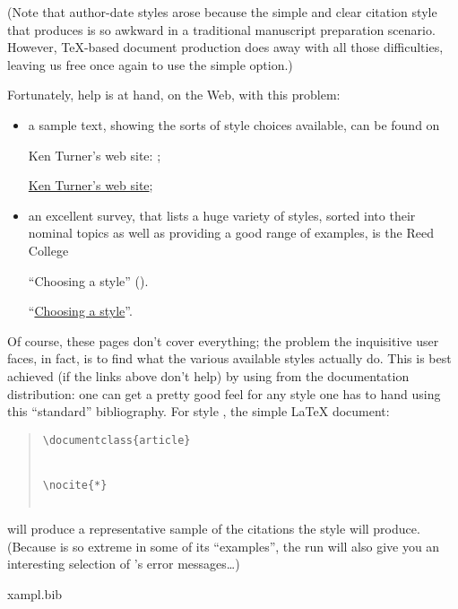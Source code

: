(Note that author-date styles arose because the simple and clear
citation style that  produces is so awkward in a
traditional manuscript preparation scenario.  However, \TeX{}-based
document production does away with all those difficulties, leaving us
free once again to use the simple option.)

Fortunately, help is at hand, on the Web, with this problem:
\begin{itemize}
\item a sample text, showing the sorts of style choices available, can
  be found on 
\begin{narrowversion}
  Ken Turner's web site:
  ;
\end{narrowversion}
\begin{wideversion}
  \href{http://www.cs.stir.ac.uk/~kjt/software/latex/showbst.html}{Ken Turner's web site};
\end{wideversion}
\item an excellent survey, that lists a huge variety of styles,
  sorted into their nominal topics as well as providing a good range
  of examples, is the Reed College %
\begin{narrowversion}
  ``Choosing a \BibTeX{} style''
  ().
\end{narrowversion}
\begin{wideversion}
  ``\href{http://web.reed.edu/cis/help/LaTeX/bibtexstyles.html}{Choosing a \BibTeX{} style}''.
\end{wideversion}
\end{itemize}

Of course, these pages don't cover everything; the problem the
inquisitive user faces, in fact, is to find what the various available
styles actually do.  This is best achieved (if the links above don't
help) by using  from the \BibTeX{} documentation
distribution: one can get a pretty good feel for any style one has to
hand using this ``standard'' bibliography.  For style
, the simple \LaTeX{} document:
\begin{quote}
\begin{verbatim}
\documentclass{article}


\nocite{*}


\end{verbatim}
\end{quote}
will produce a representative sample of the citations the style will
produce.  (Because  is so extreme in some of its
``examples'', the \BibTeX{} run will also give you an interesting
selection of \BibTeX{}'s error messages\dots{})
\begin{ctanrefs}
\item[xampl.bib]
\end{ctanrefs}

